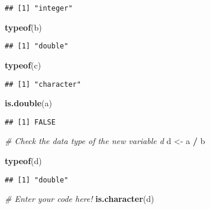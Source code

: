 \documentclass[
]{article}
\newenvironment{Shaded}{\begin{snugshade}}{\end{snugshade}}
\newcommand{\CommentTok}[1]{\textcolor[rgb]{0.56,0.35,0.01}{\textit{#1}}}
\newcommand{\FunctionTok}[1]{\textcolor[rgb]{0.13,0.29,0.53}{\textbf{#1}}}
\newcommand{\NormalTok}[1]{#1}
\newcommand{\OtherTok}[1]{\textcolor[rgb]{0.56,0.35,0.01}{#1}}
\newcommand{\SpecialCharTok}[1]{\textcolor[rgb]{0.81,0.36,0.00}{\textbf{#1}}}
\begin{document}
\begin{verbatim}
## [1] "integer"
\end{verbatim}

\begin{Shaded}
\begin{Highlighting}[]
\FunctionTok{typeof}\NormalTok{(b)}
\end{Highlighting}
\end{Shaded}

\begin{verbatim}
## [1] "double"
\end{verbatim}

\begin{Shaded}
\begin{Highlighting}[]
\FunctionTok{typeof}\NormalTok{(c)}
\end{Highlighting}
\end{Shaded}

\begin{verbatim}
## [1] "character"
\end{verbatim}

\begin{Shaded}
\begin{Highlighting}[]
\FunctionTok{is.double}\NormalTok{(a)}
\end{Highlighting}
\end{Shaded}

\begin{verbatim}
## [1] FALSE
\end{verbatim}

\begin{Shaded}
\begin{Highlighting}[]
\CommentTok{\# Check the data type of the new variable \textquotesingle{}d\textquotesingle{}}
\NormalTok{d }\OtherTok{\textless{}{-}}\NormalTok{ a }\SpecialCharTok{/}\NormalTok{ b}

\FunctionTok{typeof}\NormalTok{(d)}
\end{Highlighting}
\end{Shaded}

\begin{verbatim}
## [1] "double"
\end{verbatim}

\begin{Shaded}
\begin{Highlighting}[]
\CommentTok{\# Enter your code here!}
\FunctionTok{is.character}\NormalTok{(d)}
\end{Highlighting}
\end{Shaded}
\end{document}
